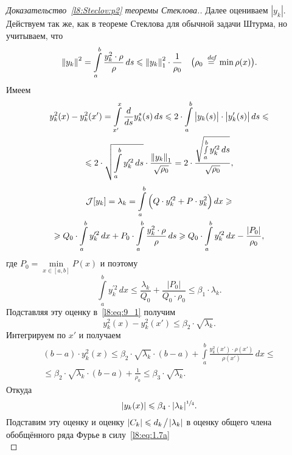 \begin{proof}[Доказательство~\ref{l8:Steclov:p2} теоремы Стеклова.]
	Далее оцениваем $|y_k|$. Действуем так же, как в теореме Стеклова для обычной задачи Штурма, но учитываем, что
	\begin{equation*}
		\left\|y_k\right\|^2=\int\limits_a^b\frac{y_k^2\cdot\rho}{\rho}\,ds\leqslant\left\|y_k\right\|^2_1\cdot\frac{1}{\rho_0}\quad\big(\rho_0\stackrel{\hspace{0.09 cm}de\!f}{=}\min\rho(x)\big).
	\end{equation*}
	Имеем
	\begin{multline}
		\label{l8:eq:9_1}
		y^2_k(x)-y^2_k(x')=\int\limits_{x'}^{x}\frac{d}{ds}y_k^s(s)\,ds\leqslant2\cdot\int\limits_a^b\big|y_k(s)\big|\cdot\big|y'_k(s)\big|\,ds\leqslant\\\leqslant2\cdot\sqrt{\int\limits_a^b y_k^{\prime2}\,ds}\cdot\frac{\left\|y_k\right\|_1}{\sqrt{\rho_0}}=2\cdot\frac{\sqrt{\smallint\limits_a^b y_k^{\prime2}\,ds}}{\sqrt{\rho_0}},
	\end{multline}
	\begin{multline*}
		\mathcal{J}[y_k]=\lambda_k=\int\limits_a^b\Big(Q\cdot y_k^{\prime2}+P\cdot y_k^2\Big)\,dx\geqslant\\\geqslant Q_0\cdot\int\limits_a^b y_k^{\prime2}\,dx+P_0\cdot\int\limits_a^b\frac{y_k^2\cdot\rho}{\rho}\,ds\geqslant Q_0\cdot\int\limits_a^b y_k^{\prime2}\,dx-\frac{|P_0|}{\rho_0},
	\end{multline*}
	где $P_0=\min\limits_{x\in[a,b]}P(x)$ и поэтому 
	\begin{equation*}
		\int\limits_a^b y_k^{\prime2}\,dx\leqslant\frac{\lambda_k}{Q_0}+\frac{|P_0|}{Q_0\cdot\rho_0}\leqslant\beta_1\cdot\lambda_k.
	\end{equation*}
	Подставляя эту оценку в~\eqref{l8:eq:9_1} получим 
	\begin{equation*}
		 y_k^2(x)-y_k^2(x')\leqslant\beta_2\cdot\sqrt{\lambda_k}.
	\end{equation*}
	Интегрируем по $x'$ и получаем 
	\begin{multline*}
		(b-a)\cdot y_k^2(x)\leqslant\beta_2\cdot\sqrt{\lambda_k}\cdot(b-a)+\int\limits_a^b\frac{y_k^2(x')\cdot\rho(x')}{\rho(x')}\,dx\leqslant\\\leqslant\beta_2\cdot\sqrt{\lambda_k}\cdot(b-a)+\frac{1}{\rho_0}\leqslant\beta_3\cdot\sqrt{\lambda_k}.
	\end{multline*}
	Откуда
	\begin{equation*}
		|y_k(x)|\leqslant\beta_4\cdot|\lambda_k|^{\sfrac{1}{4}}.
	\end{equation*}
	Подставим эту оценку и оценку $|C_k|\leqslant d_k\!\bigm/\!|\lambda_k|$ в оценку общего члена обобщённого ряда Фурье в силу~\eqref{l8:eq:1.7a}
	\begin{equation*}

\end{equation*}
\end{proof}

